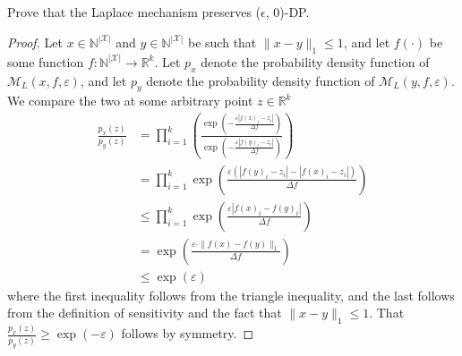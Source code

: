 \documentclass{ctexart}
\begin{document}
\subsection{\hei}
Prove that the Laplace mechanism preserves ($\epsilon$, 0)-DP.
\par
\begin{proof} Let $x \in \mathbb{N}^{|\mathcal{X}|}$ and $y \in \mathbb{N}^{|\mathcal{X}|}$ be such that $\|x-y\|_{1} \leq 1$, and let $f(\cdot)$ be some function $f: \mathbb{N}^{|\mathcal{X}|} \rightarrow \mathbb{R}^{k}$. Let $p_{x}$ denote the probability density function of $\mathcal{M}_{L}(x, f, \varepsilon)$, and let $p_{y}$ denote the probability density function of $\mathcal{M}_{L}(y, f, \varepsilon)$. We compare the two at some arbitrary point $z \in \mathbb{R}^{k}$
    $$
        \begin{aligned}
            \frac{p_{x}(z)}{p_{y}(z)} & =\prod_{i=1}^{k}\left(\frac{\exp \left(-\frac{\varepsilon\left|f(x)_{i}-z_{i}\right|}{\Delta f}\right)}{\exp \left(-\frac{\varepsilon\left|f(y)_{i}-z_{i}\right|}{\Delta f}\right)}\right) \\
                                      & =\prod_{i=1}^{k} \exp \left(\frac{\varepsilon\left(\left|f(y)_{i}-z_{i}\right|-\left|f(x)_{i}-z_{i}\right|\right)}{\Delta f}\right)                                                        \\
                                      & \leq \prod_{i=1}^{k} \exp \left(\frac{\varepsilon\left|f(x)_{i}-f(y)_{i}\right|}{\Delta f}\right)                                                                                          \\
                                      & =\exp \left(\frac{\varepsilon \cdot\|f(x)-f(y)\|_{1}}{\Delta f}\right)                                                                                                                     \\
                                      & \leq \exp (\varepsilon)
        \end{aligned}
    $$
    where the first inequality follows from the triangle inequality, and the last follows from the definition of sensitivity and the fact that $\|x-y\|_{1} \leq 1$. That $\frac{p_{x}(z)}{p_{y}(z)} \geq \exp (-\varepsilon)$ follows by symmetry.
\end{proof}
\end{document}
